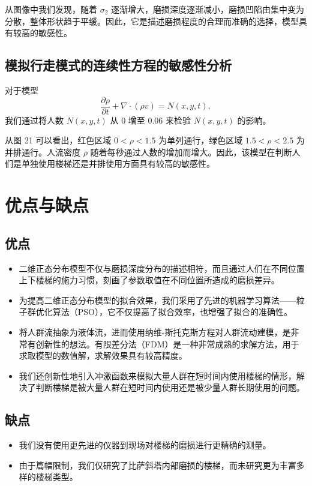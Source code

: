 \documentclass[11pt,a4paper]{ctexart}
\begin{document}
从图像中我们发现，随着 $\sigma_2$ 逐渐增大，磨损深度逐渐减小，磨损凹陷由集中变为分散，整体形状趋于平缓。因此，它是描述磨损程度的合理而准确的选择，模型具有较高的敏感性。

\subsection{模拟行走模式的连续性方程的敏感性分析}

对于模型
\[
\frac{\partial\rho}{\partial t}+\nabla\cdot(\rho v)=N(x,y,t),
\]
我们通过将人数 $N(x,y,t)$ 从 0 增至 0.06 来检验 $N(x,y,t)$ 的影响。

从图 21 可以看出，红色区域 $0<\rho<1.5$ 为单列通行，绿色区域 $1.5<\rho<2.5$ 为并排通行。人流密度 $\rho$ 随着每秒通过人数的增加而增大。因此，该模型在判断人们是单独使用楼梯还是并排使用方面具有较高的敏感性。

\section{优点与缺点}

\subsection{优点}

\begin{itemize}[leftmargin=2em,itemsep=3pt,topsep=2pt]
\item 二维正态分布模型不仅与磨损深度分布的描述相符，而且通过人们在不同位置上下楼梯的施力习惯，刻画了参数取值在不同位置所造成的磨损差异。
\item 为提高二维正态分布模型的拟合效果，我们采用了先进的机器学习算法——粒子群优化算法（PSO），它不仅提高了拟合效率，也增强了拟合的准确性。
\item 将人群流抽象为液体流，进而使用纳维-斯托克斯方程对人群流动建模，是非常有创新性的想法。有限差分法（FDM）是一种非常成熟的求解方法，用于求取模型的数值解，求解效果具有较高精度。
\item 我们还创新性地引入冲激函数来模拟大量人群在短时间内使用楼梯的情形，解决了判断楼梯是被大量人群在短时间内使用还是被少量人群长期使用的问题。
\end{itemize}

\subsection{缺点}

\begin{itemize}[leftmargin=2em,itemsep=3pt,topsep=2pt]
\item 我们没有使用更先进的仪器到现场对楼梯的磨损进行更精确的测量。
\item 由于篇幅限制，我们仅研究了比萨斜塔内部磨损的楼梯，而未研究更为丰富多样的楼梯类型。
\end{itemize}
\end{document}
